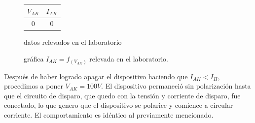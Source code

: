         \begin{figure}[!ht]
          \centering
          \begin{minipage}{0.3\textwidth}
            \centering
            \begin{tabular}{c|c}
              $V_{AK}$ & $I_{AK}$ \\ \hline
              0     & 0     \\
            \end{tabular}
            \caption{datos relevados en el laboratorio}
            \label{tab:scr_vak100_lab}
          \end{minipage}
          \hfill
          \begin{minipage}{0.6\textwidth}
            \caption{gráfica $I_{AK} = f_{(V_{AK})}$ relevada en el laboratorio.}
            \label{graph:scr_ig_vg_vak100_lab}
          \end{minipage}
        \end{figure}

        Después de haber logrado apagar el dispositivo haciendo que $I_{AK} < I_H$, procedimos a poner $V_{AK} = 100V$.
        El dispositivo permaneció sin polarización hasta que el circuito de disparo, que quedo con la tensión y
        corriente de disparo, fue conectado, lo que genero que el dispositivo se polarice y comience a circular
        corriente. El comportamiento es idéntico al previamente mencionado.

